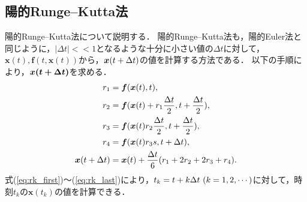 \subsection{陽的Runge--Kutta法}
陽的Runge--Kutta法について説明する．
陽的Runge--Kutta法も，陽的Euler法と同じように，$|\Delta t| << 1 $となるような十分に小さい値の$\Delta t$に対して，$\bm{x}(t),\bm{f}(t,\bm{x}(t))$から，$\bm{x}(t + \Delta t )$の値を計算する方法である．
以下の手順により，$\bm{x(t + \Delta t)}$を求める．
\begin{align}
    r_1 &= \bm{f}(\bm{x}(t),t), \label{eq:rk_first}\\
    r_2 &= \bm{f}(\bm{x}(t)+r_1 \frac{\Delta t}{2},t + \frac{\Delta t}{2}), \\
    r_3 &= \bm{f}(\bm{x}(t)r_2 \frac{\Delta t}{2}, t + \frac{\Delta t}{2}), \\
    r_4 &= \bm{f}(\bm{x}(t)r_3 s, t + \Delta t), \\
    \bm{x}(t + \Delta t) &= \bm{x}(t) + \frac{\Delta t}{6}(r_1 + 2r_2 + 2r_3 + r_4). \label{eq:rk_last}
\end{align}
式(\ref{eq:rk_first})〜(\ref{eq:rk_last})により，$t_k = t + k\Delta t \ (k = 1,2,\cdots)$に対して，時刻$t_k$の$\bm{x}(t_k)$の値を計算できる．


